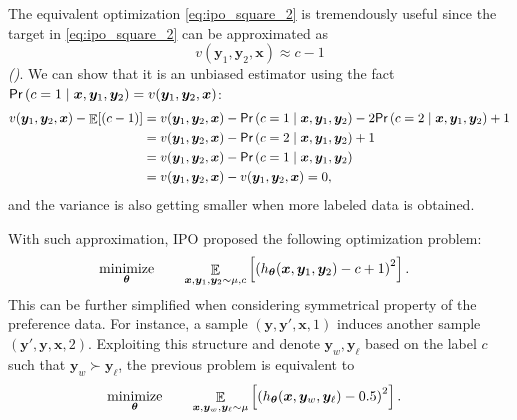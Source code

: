 \documentclass[11pt,a4paper]{article}
\begin{document}
The equivalent optimization \eqref{eq:ipo_square_2} is tremendously useful since the target in \eqref{eq:ipo_square_2} can be approximated as
\[
v(\bm{y}_1, \bm{y}_2, \bm{x}) \approx c-1
\]
\textit{()}.
We can show that it is an unbiased estimator using the fact $\textsf{Pr}\left(c=1 \mid \bm{x}, \bm{y}_1, \bm{y}_2\right) = v(\bm{y}_1, \bm{y}_2, \bm{x})$:
\begin{align*}
v(\bm{y}_1, \bm{y}_2, \bm{x}) - \mathop{\mathbb{E}}[(c-1)] 
&= v(\bm{y}_1, \bm{y}_2, \bm{x}) -\textsf{Pr}\left(c=1 \mid \bm{x}, \bm{y}_1, \bm{y}_2\right) - 2\textsf{Pr}\left(c=2 \mid \bm{x}, \bm{y}_1, \bm{y}_2\right)+1 \\
&=v(\bm{y}_1, \bm{y}_2, \bm{x}) - \textsf{Pr}\left(c=2 \mid \bm{x}, \bm{y}_1, \bm{y}_2\right) + 1 \\
&=v(\bm{y}_1, \bm{y}_2, \bm{x}) - \textsf{Pr}\left(c=1 \mid \bm{x}, \bm{y}_1, \bm{y}_2\right)  \\
&=v(\bm{y}_1, \bm{y}_2, \bm{x}) - v(\bm{y}_1, \bm{y}_2, \bm{x})  = 0,
\end{align*} 
and the variance is also getting smaller when more labeled data is obtained.

With such approximation, IPO proposed the following optimization problem:
\begin{alignat}{2}
    & \operatorname*{\text{minimize}}_{\boldsymbol \theta} \quad && \mathop{\mathbb{E}}_{\bm{x}, \bm{y}_1, \bm{y}_2\sim \mu, c} \left[ \left(  h_{\boldsymbol \theta}(\bm{x}, \bm{y}_1, \bm{y}_2)  - c+1 \right) ^2\right].
\end{alignat}
This can be further simplified when considering symmetrical property of the preference data. For instance, a sample $(\bm{y}, \bm{y}', \bm{x}, 1)$ induces another sample $(\bm{y}', \bm{y}, \bm{x}, 2)$.
Exploiting this structure and denote $\bm{y}_w, \bm{y}_\ell $ based on the label $c$ such that $\bm{y}_w \succ \bm{y}_\ell $, the previous problem is equivalent to
\begin{alignat}{2}
    & \operatorname*{\text{minimize}}_{\boldsymbol \theta} \quad && \mathop{\mathbb{E}}_{\bm{x}, \bm{y}_w, \bm{y}_{\ell }\sim \mu} \left[ \left(  h_{\boldsymbol \theta}(\bm{x}, \bm{y}_w, \bm{y}_\ell )  - 0.5 \right) ^2\right].
\end{alignat}
\end{document}
